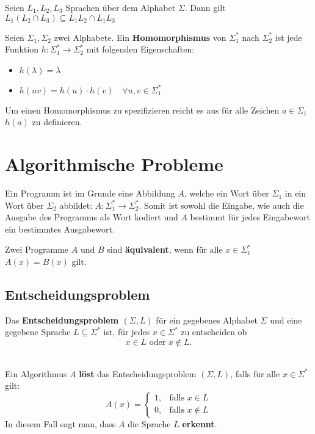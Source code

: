 \begin{lemma}
Seien $L_1, L_2, L_3$ Sprachen über dem Alphabet $\Sigma$. Dann gilt $L_1 (L_2 \cap L_3) \subseteq L_1 L_2 \cap L_1 L_3$\\
\end{lemma}

\begin{definition}
Seien $\Sigma_1, \Sigma_2$ zwei Alphabete. Ein \textbf{Homomorphismus} von $\Sigma_1^*$ nach $\Sigma_2^*$ ist jede Funktion $h: \Sigma_1^* \to \Sigma_2^*$ mit folgenden Eigenschaften:
\begin{itemize}
  \item $h(\lambda) = \lambda$
  \item $h(uv) = h(u) \cdot h(v) \quad \forall u,v \in \Sigma_1^*$\\
\end{itemize}
\end{definition}

\begin{remark}
Um einen Homomorphismus zu spezifizieren reicht es aus für alle Zeichen $a \in \Sigma_1$ $h(a)$ zu definieren.
\end{remark}

\section{Algorithmische Probleme}
Ein Programm ist im Grunde eine Abbildung $A$, welche ein Wort über $\Sigma_1$ in ein Wort über $\Sigma_2$ abbildet: $A: \Sigma_1^* \to \Sigma_2^*$. Somit ist sowohl die Eingabe, wie auch die Ausgabe des Programms als Wort kodiert und $A$ bestimmt für jedes Eingabewort ein bestimmtes Ausgabewort.


Zwei Programme $A$ und $B$ sind \textbf{äquivalent}, wenn für alle $x \in \Sigma_1^*$ $A(x) = B(x)$ gilt.

\subsection{Entscheidungsproblem}
\begin{definition}
Das \textbf{Entscheidungsproblem $(\Sigma, L)$} für ein gegebenes Alphabet $\Sigma$ und eine gegebene Sprache $L \subseteq \Sigma^*$ ist, für jedes $x \in \Sigma^*$ zu entscheiden ob
\[
x \in L \text{ oder } x \not\in L.
\]\\
\end{definition}

\begin{definition}
Ein Algorithmus $A$ \textbf{löst} das Entscheidungsproblem $(\Sigma, L)$, falls für alle $x \in \Sigma^*$ gilt:
\[
A(x) =
\begin{cases}
1, &\text{falls } x \in L \\
0, &\text{falls } x \not \in L
\end{cases}
\]
In diesem Fall sagt man, dass $A$ die Sprache $L$ \textbf{erkennt}.\\
\end{definition}

